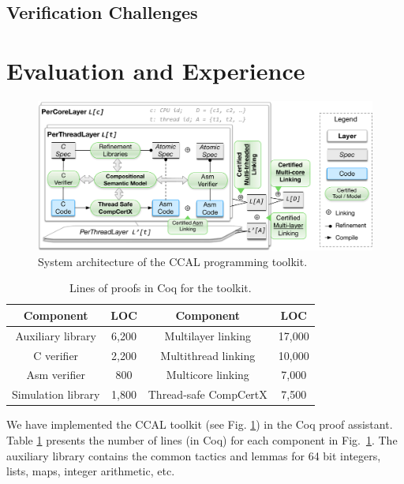 \subsection{Verification Challenges}

\section{Evaluation and Experience}
\label{sec:kernel}

\begin{figure}[t]
\centering
\includegraphics[scale=.45]{figs/tool_chain}
\caption{System architecture of the CCAL programming toolkit.}
\label{fig:toolchain}
\end{figure}

\begin{table}
\begin{center}
\begin{footnotesize}
\renewcommand{\arraystretch}{1} 
\begin{tabular}{|c|c||c|c|}
\hline
Component & LOC & Component & LOC \\
\hline
\hline
Auxiliary library & 6,200 & Multilayer linking & 17,000 \\
\hline
C verifier & 2,200 & Multithread linking & 10,000 \\
\hline
Asm verifier & 800 & Multicore linking & 7,000 \\
\hline
Simulation library & 1,800 & Thread-safe CompCertX & 7,500\\
\hline
\end{tabular}
\end{footnotesize}
\end{center}
\caption{Lines of proofs in Coq for the toolkit.}
\label{table:toolkit}
\end{table}

We have implemented the CCAL toolkit (see Fig. \ref{fig:toolchain}) in the Coq proof assistant. 
Table
\ref{table:toolkit} presents the number of lines (in Coq) for each component in Fig.~\ref{fig:toolchain}. The auxiliary library contains the common
tactics and lemmas for 64 bit integers, lists, maps, integer
arithmetic, {etc}.

